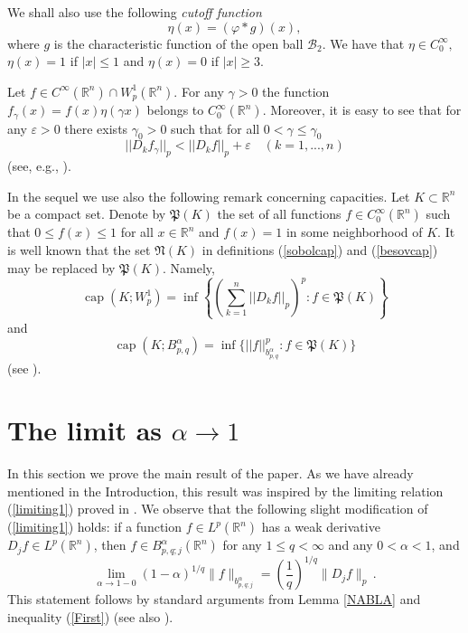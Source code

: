 \documentclass[12pt,twoside,reqno]{amsart}
\numberwithin{equation}{section}
\theoremstyle{definition}
\numberwithin{equation}{section}
\begin{document}
 We shall  also use the following {\it cutoff function}
 \begin{equation}\label{cutoff}
 \eta(x)= ({\varphi}\ast g)(x),
 \end{equation}
 where $g$ is the characteristic function of the open ball $\mathcal {B}_2$. We have that $\eta\in C_0^\infty,$
 $\eta(x)=1$ if $|x|\le 1$ and $\eta(x)=0$ if $|x|\ge 3$.

 Let $f\in C^\infty({\mathbb{R}}^n)\cap W_p^1({\mathbb{R}}^n).$ For any ${\gamma }>0$ the function $f_\gamma(x)=f(x)\eta({\gamma } x)$
 belongs to $C_0^\infty({\mathbb{R}}^n)$. Moreover, it is easy to see that for
 any ${\varepsilon}>0$ there exists  $\gamma_0>0$ such that for all $0<{\gamma }\le
 {\gamma }_0$
 \begin{equation}\label{gamma}
 ||D_k f_{\gamma }||_p<||D_k f||_p + {\varepsilon} \quad (k=1,...,n)
\end{equation}
(see, e.g., \cite[p. 124]{St}).

In the sequel we use also the following remark concerning
capacities. Let $K\subset {\mathbb{R}}^n$ be a compact set. Denote by
$\mathfrak{P}(K)$ the set of all functions $f\in C_0^\infty({\mathbb{R}}^n)$
such that $0\le f(x)\le 1$ for all $x\in {\mathbb{R}}^n$ and $f(x)=1$ in some
neighborhood of $K.$ It is well known that the set $\mathfrak{N}(K)$
in definitions (\ref{sobolcap}) and (\ref{besovcap}) may be replaced
by $\mathfrak{P}(K)$. Namely,
$$
{\operatorname{cap}}(K;W_p^1)=\inf\left\{\left(\sum_{k=1}^n||D_k f||_p\right)^p: f\in \mathfrak{P}(K)\right\}
$$
and
$$
{\operatorname{cap}}(K;B_{p,q}^{\alpha})=\inf\{||f||_{b_{p,q}^{\alpha}}^p: f\in \mathfrak{P}(K)\}
$$
(see \cite[2.2.1]{Maz2}).

 \vskip 6pt
\section{The limit as ${\alpha}\to 1$}

In this section we prove the main result of the paper. As we have
already mentioned in the Introduction, this result was inspired by
the limiting relation (\ref{limiting1}) proved in \cite{BBM1}. We
observe that  the following slight modification of (\ref{limiting1})
holds: if  a function $f\in L^p({\mathbb R}^n)$ has a weak
derivative $D_jf \in L^p({\mathbb R}^n)$, then  $f\in
B_{p,q;j}^{\alpha}({\mathbb{R}}^n)$ for any $1\le q <\infty$ and any $0<{\alpha}<1$, and
$$
\lim_{{\alpha}\to
1-0}(1-{\alpha})^{1/q}\|f\|_{b^{\alpha}_{p,q;j}}=\left(\frac{1}{q}\right)^{1/q}
\|D_jf\|_p\,.
$$
This statement follows by standard arguments from Lemma \ref{NABLA} and inequality (\ref{First}) (see also \cite[Section 14.3]{Leo1}).
\end{document}
